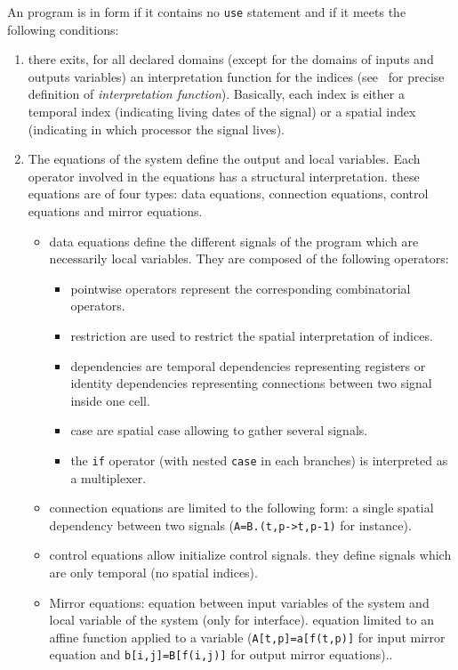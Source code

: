An {\Alpha} program is in {\AlphaZ} form if it contains no {\tt use} statement
and if it meets the following conditions:

\begin{enumerate}
\item there exits, for all declared domains (except for the domains of 
inputs and outputs variables) an interpretation function for the indices
(see~\cite{dezan} for precise definition of {\em interpretation function}).
 Basically, each index is either 
a temporal index (indicating living dates of the signal) or a spatial index
(indicating in which processor the signal lives).


\item The equations of the system define the output and local
 variables.  Each operator involved in the equations has a structural
 interpretation. these equations are of four types: data equations,
 connection equations, control equations and mirror equations.
\begin{itemize} 
\item data equations define the different signals of the program
which are necessarily local variables.
They are composed of the following operators:  
\begin{itemize} 
  \item pointwise operators represent the corresponding combinatorial 
operators. 
  \item restriction are used to restrict the spatial interpretation of 
indices.
\item  dependencies are temporal dependencies representing registers 
or identity dependencies representing connections between two signal inside one cell.
\item case are spatial case allowing to gather several signals.
\item the {\tt if} operator (with nested {\tt case} in each branches)
is interpreted as a multiplexer.
\end{itemize}
\item connection equations are limited to the following form: a single
spatial dependency between two signals ({\tt A=B.(t,p->t,p-1)} for
instance).
\item control equations allow initialize control signals. they define signals
which are only temporal (no spatial indices).
\item Mirror equations: equation between input variables of the system and 
local variable of the system (only for interface). equation limited to an 
affine function applied to a variable ({\tt A[t,p]=a[f(t,p)]} for input mirror
equation and {\tt b[i,j]=B[f(i,j)]} for output mirror equations)..
\end{itemize}
\end{enumerate}

